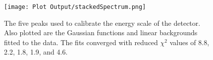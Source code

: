 \documentclass[letter]{article}
\begin{document}
\newpage
\begin{figure}[p] \centering
    \texttt{[image: Plot Output/stackedSpectrum.png]}
    \caption{The five peaks used to calibrate the energy scale of the detector. Also plotted are the Gaussian functions and linear backgrounds fitted to the data. The fits converged with reduced $\chi^2$ values of \num{8.8}, \num{2.2}, \num{1.8}, \num{1.9}, and \num{4.6}.}
    \label{fig:CalibStack}
\end{figure}
\end{document}
